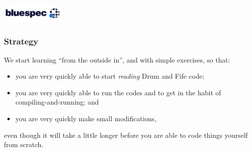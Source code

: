 



\date{L3: Structure of BSV Programs}





\begin{frame}
 \titlepage

 \begin{center}
  \includegraphics[height=1cm]{../Figures/Bluespec_Logo_2022-10}
 \end{center}
\end{frame}





\begin{frame}
\frametitle{Strategy}

\footnotesize

We start learning {\BSV} ``from the outside in'', and with simple
exercises, so that:

\vspace{2ex}

\begin{itemize}

 \item you are very quickly able to start \emph{reading} Drum and Fife code;

 \item you are very quickly able to run the codes and to get in the
       habit of compiling-and-running; and

 \item you are very quickly make small modifications,

\end{itemize}

\vspace{2ex}

even though it will take a little longer before you are able to code
things yourself from scratch.

\end{frame}

